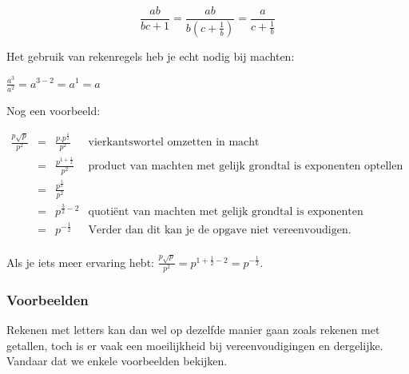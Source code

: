 \begin{itemize}
	\begin{equation*}
	{\displaystyle \frac{ab}{bc+1}={\displaystyle \frac{ab}{b(c+\frac{1}{b})}=\frac{a}{c+\frac{1}{b}}}}
	\end{equation*}
	
	\medskip{}
	
	
	\noindent Het gebruik van rekenregels heb je echt nodig bij machten:
	
	\noindent ${\displaystyle \frac{a^{3}}{a^{2}}=a^{3-2}=a^{1}=a}$
	
	\noindent \medskip{}
	
	
	\noindent Nog een voorbeeld:
	
	\begin{math}
	\begin{array}{ccc|r}
	{\displaystyle \frac{p\sqrt{p}}{p^{2}}} & = & {\displaystyle \frac{p.p^{\frac{1}{2}}}{p^{2}}} &   \text{vierkantswortel omzetten in macht}\\
	& = & {\displaystyle \frac{p^{1+\frac{1}{2}}}{p^{2}}} &  \text{product van machten met gelijk grondtal is exponenten optellen}\\
	& = & {\displaystyle \frac{p^{\frac{3}{2}}}{p^{2}}} &  \\
	& = & {\displaystyle p^{\frac{3}{2}-2}} &  \text{quoti\"ent van machten met gelijk grondtal is exponenten aftrekken}\\
	& = & {\displaystyle p^{-\frac{1}{2}}} &  \text{Verder dan dit kan je de opgave niet vereenvoudigen.}\\
	\end{array}
	\end{math}
	
	\noindent Als je iets meer ervaring hebt: ${\displaystyle \frac{p\sqrt{p}}{p^{2}}=p^{1+\frac{1}{2}-2}={\displaystyle p^{-\frac{1}{2}}}}$.
	
\end{itemize}


\subsubsection{Voorbeelden}

\noindent Rekenen met letters kan dan wel op dezelfde manier gaan
zoals rekenen met getallen, toch is er vaak een moeilijkheid bij vereenvoudigingen
en dergelijke. Vandaar dat we enkele voorbeelden bekijken.

